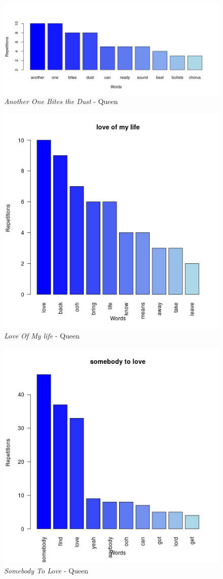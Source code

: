 \begin{figure}[h]
	\centering
	\includegraphics[width=0.7\linewidth]{Imagenes/AnotherOneBitesTheDust}
	\caption{\textit{Another One Bites the Dust} - Queen}
	\label{fig:AnotherOneBitesTheDust}
\end{figure}
\begin{figure}[!h]
	\centering
	\includegraphics[width=0.7\linewidth]{Imagenes/loveofmylife}
	\caption{\textit{Love Of My life} - Queen}
	\label{fig:loveofmylife}
\end{figure}
\begin{figure}[!h]
	\centering
	\includegraphics[width=0.7\linewidth]{Imagenes/somebodytolove}
	\caption{\textit{Somebody To Love} - Queen}
	\label{fig:sbtl}	
\end{figure}
